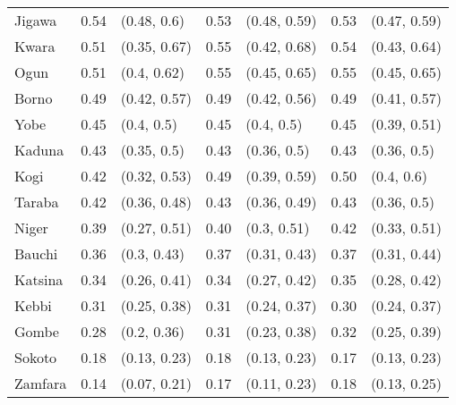 \begin{tabular}{lrlrlrl}
Jigawa & 0.54 & (0.48, 0.6) & 0.53 & (0.48, 0.59) & 0.53 & (0.47, 0.59)\\
Kwara & 0.51 & (0.35, 0.67) & 0.55 & (0.42, 0.68) & 0.54 & (0.43, 0.64)\\
Ogun & 0.51 & (0.4, 0.62) & 0.55 & (0.45, 0.65) & 0.55 & (0.45, 0.65)\\
Borno & 0.49 & (0.42, 0.57) & 0.49 & (0.42, 0.56) & 0.49 & (0.41, 0.57)\\
Yobe & 0.45 & (0.4, 0.5) & 0.45 & (0.4, 0.5) & 0.45 & (0.39, 0.51)\\
Kaduna & 0.43 & (0.35, 0.5) & 0.43 & (0.36, 0.5) & 0.43 & (0.36, 0.5)\\
Kogi & 0.42 & (0.32, 0.53) & 0.49 & (0.39, 0.59) & 0.50 & (0.4, 0.6)\\
Taraba & 0.42 & (0.36, 0.48) & 0.43 & (0.36, 0.49) & 0.43 & (0.36, 0.5)\\
Niger & 0.39 & (0.27, 0.51) & 0.40 & (0.3, 0.51) & 0.42 & (0.33, 0.51)\\
Bauchi & 0.36 & (0.3, 0.43) & 0.37 & (0.31, 0.43) & 0.37 & (0.31, 0.44)\\
Katsina & 0.34 & (0.26, 0.41) & 0.34 & (0.27, 0.42) & 0.35 & (0.28, 0.42)\\
Kebbi & 0.31 & (0.25, 0.38) & 0.31 & (0.24, 0.37) & 0.30 & (0.24, 0.37)\\
Gombe & 0.28 & (0.2, 0.36) & 0.31 & (0.23, 0.38) & 0.32 & (0.25, 0.39)\\
Sokoto & 0.18 & (0.13, 0.23) & 0.18 & (0.13, 0.23) & 0.17 & (0.13, 0.23)\\
Zamfara & 0.14 & (0.07, 0.21) & 0.17 & (0.11, 0.23) & 0.18 & (0.13, 0.25)\\
\bottomrule
\end{tabular}
